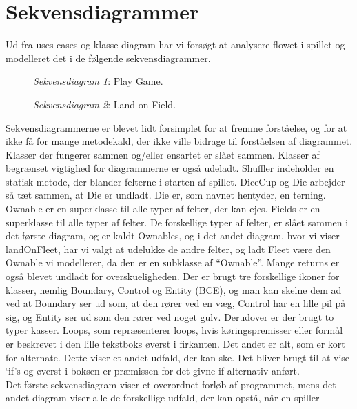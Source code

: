 \section*{Sekvensdiagrammer}
Ud fra uses cases og klasse diagram har vi forsøgt at analysere flowet i spillet
og modelleret det i de følgende sekvensdiagrammer.
\begin{figure}[h]
\centering
{}
\caption{\emph{Sekvensdiagram 1}: Play Game.}
\end{figure}
\FloatBarrier
\begin{figure}[h]
\centering
{}
\caption{\emph{Sekvensdiagram 2}: Land on Field.}
\end{figure}
\FloatBarrier
Sekvensdiagrammerne er blevet lidt forsimplet for at fremme forståelse, og for
at ikke få for mange metodekald, der ikke ville bidrage til forståelsen af
diagrammet. Klasser der fungerer sammen og/eller ensartet er slået sammen.
Klasser af begrænset vigtighed for diagrammerne er også udeladt. Shuffler
indeholder en statisk metode, der blander felterne i starten af spillet. DiceCup
og Die arbejder så tæt sammen, at Die er undladt. Die er, som navnet hentyder,
en terning. Ownable er en superklasse til alle typer af felter, der kan ejes.
Fields er en superklasse til alle typer af felter. De forskellige typer af
felter, er slået sammen i det første diagram, og er kaldt Ownables, og i det
andet diagram, hvor vi viser landOnFleet, har vi valgt at udelukke de andre
felter, og ladt Fleet være den Ownable vi modellerer, da den er en subklasse af
“Ownable”. Mange returns er også blevet undladt for overskueligheden. Der er
brugt tre forskellige ikoner for klasser, nemlig Boundary, Control og Entity
(BCE), og man kan skelne dem ad ved at Boundary ser ud som, at den rører ved en
væg, Control har en lille pil på sig, og Entity ser ud som den rører ved noget
gulv. Derudover er der brugt to typer kasser. Loops, som repræsenterer loops,
hvis køringspremisser eller formål er beskrevet i den lille tekstboks øverst i
firkanten. Det andet er alt, som er kort for alternate. Dette viser et andet
udfald, der kan ske. Det bliver brugt til at vise ‘if’s og øverst i boksen er
præmissen for det givne if-alternativ anført.\\
\indent Det første sekvensdiagram viser et overordnet forløb af programmet, mens
det andet diagram viser alle de forskellige udfald, der kan opstå, når en spiller
